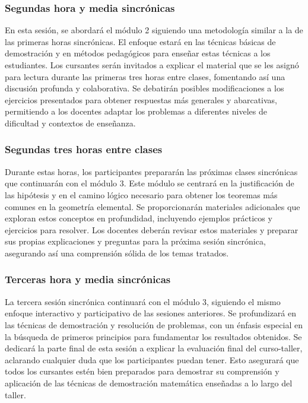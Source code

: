 \subsubsection{Segundas hora y media sincrónicas}

En esta sesión, se abordará el módulo 2 siguiendo una metodología similar a la de las primeras horas sincrónicas. El enfoque estará en las técnicas básicas de demostración y en métodos pedagógicos para enseñar estas técnicas a los estudiantes. Los cursantes serán invitados a explicar el material que se les asignó para lectura durante las primeras tres horas entre clases, fomentando así una discusión profunda y colaborativa. Se debatirán posibles modificaciones a los ejercicios presentados para obtener respuestas más generales y abarcativas, permitiendo a los docentes adaptar los problemas a diferentes niveles de dificultad y contextos de enseñanza.

\subsubsection{Segundas tres horas entre clases}

Durante estas horas, los participantes prepararán las próximas clases sincrónicas que continuarán con el módulo 3. Este módulo se centrará en la justificación de las hipótesis y en el camino lógico necesario para obtener los teoremas más comunes en la geometría elemental. Se proporcionarán materiales adicionales que exploran estos conceptos en profundidad, incluyendo ejemplos prácticos y ejercicios para resolver. Los docentes deberán revisar estos materiales y preparar sus propias explicaciones y preguntas para la próxima sesión sincrónica, asegurando así una comprensión sólida de los temas tratados.

\subsubsection{Terceras hora y media sincrónicas}

La tercera sesión sincrónica continuará con el módulo 3, siguiendo el mismo enfoque interactivo y participativo de las sesiones anteriores. Se profundizará en las técnicas de demostración y resolución de problemas, con un énfasis especial en la búsqueda de primeros principios para fundamentar los resultados obtenidos. Se dedicará la parte final de esta sesión a explicar la evaluación final del curso-taller, aclarando cualquier duda que los participantes puedan tener. Esto asegurará que todos los cursantes estén bien preparados para demostrar su comprensión y aplicación de las técnicas de demostración matemática enseñadas a lo largo del taller.

